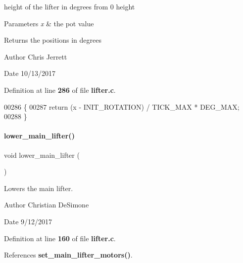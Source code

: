 height of the lifter in degrees from 0 height 


\begin{DoxyParams}{Parameters}
{\em x} & the pot value \\
\hline
\end{DoxyParams}
\begin{DoxyReturn}{Returns}
the positions in degrees 
\end{DoxyReturn}
\begin{DoxyAuthor}{Author}
Chris Jerrett 
\end{DoxyAuthor}
\begin{DoxyDate}{Date}
10/13/2017 
\end{DoxyDate}


Definition at line \textbf{ 286} of file \textbf{ lifter.\+c}.


\begin{DoxyCode}
00286                                          \{
00287   \textcolor{keywordflow}{return} (x - INIT\_ROTATION) / TICK\_MAX * DEG\_MAX;
00288 \}
\end{DoxyCode}
\mbox{\label{lifter_8c_ad36c37086a91046af4e6f619618b7719}} 
\paragraph{lower\+\_\+main\+\_\+lifter()}
{\footnotesize\ttfamily void lower\+\_\+main\+\_\+lifter (\begin{DoxyParamCaption}{ }\end{DoxyParamCaption})}



Lowers the main lifter. 

\begin{DoxyAuthor}{Author}
Christian De\+Simone 
\end{DoxyAuthor}
\begin{DoxyDate}{Date}
9/12/2017 
\end{DoxyDate}


Definition at line \textbf{ 160} of file \textbf{ lifter.\+c}.



References \textbf{ set\+\_\+main\+\_\+lifter\+\_\+motors()}.



